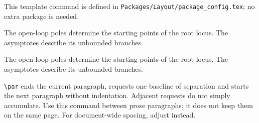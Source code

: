 
\begin{nobreaks}
This template command is defined in
\texttt{Packages/Layout/package\_config.tex}; no extra package is needed.
\begin{referencecode}
\newcommand{\spacedpar}{\par\addvspace{\baselineskip}\noindent}
\end{referencecode}
\begin{referencecode}
The open-loop poles determine the starting points of the root locus.
\spacedpar The asymptotes describe its unbounded branches.
\end{referencecode}

The open-loop poles determine the starting points of the root locus.
\spacedpar The asymptotes describe its unbounded branches.

\verb|\par| ends the current paragraph,
\texttt{\string\addvspace} requests one baseline of separation and
\texttt{\string\noindent} starts the next paragraph without indentation.
Adjacent \texttt{\string\addvspace} requests do not simply accumulate.
Use this command between prose paragraphs; it does not keep them on
the same page. For document-wide spacing, adjust
\texttt{\string\parskip} instead.
\end{nobreaks}
